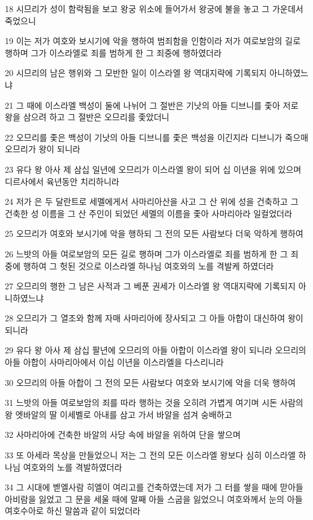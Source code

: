 \par 18 시므리가 성이 함락됨을 보고 왕궁 위소에 들어가서 왕궁에 불을 놓고 그 가운데서 죽었으니
\par 19 이는 저가 여호와 보시기에 악을 행하여 범죄함을 인함이라 저가 여로보암의 길로 행하며 그가 이스라엘로 죄를 범하게 한 그 죄중에 행하였더라
\par 20 시므리의 남은 행위와 그 모반한 일이 이스라엘 왕 역대지략에 기록되지 아니하였느냐
\par 21 그 때에 이스라엘 백성이 둘에 나뉘어 그 절반은 기낫의 아들 디브니를 좇아 저로 왕을 삼으려 하고 그 절반은 오므리를 좇았더니
\par 22 오므리를 좇은 백성이 기낫의 아들 디브니를 좇은 백성을 이긴지라 디브니가 죽으매 오므리가 왕이 되니라
\par 23 유다 왕 아사 제 삼십 일년에 오므리가 이스라엘 왕이 되어 십 이년을 위에 있으며 디르사에서 육년동안 치리하니라
\par 24 저가 은 두 달란트로 세멜에게서 사마리아산을 사고 그 산 위에 성을 건축하고 그 건축한 성 이름을 그 산 주인이 되었던 세멜의 이름을 좇아 사마리아라 일컬었더라
\par 25 오므리가 여호와 보시기에 악을 행하되 그 전의 모든 사람보다 더욱 악하게 행하여
\par 26 느밧의 아들 여로보암의 모든 길로 행하며 그가 이스라엘로 죄를 범하게 한 그 죄 중에 행하여 그 헛된 것으로 이스라엘 하나님 여호와의 노를 격발케 하였더라
\par 27 오므리의 행한 그 남은 사적과 그 베푼 권세가 이스라엘 왕 역대지략에 기록되지 아니하였느냐
\par 28 오므리가 그 열조와 함께 자매 사마리아에 장사되고 그 아들 아합이 대신하여 왕이 되니라
\par 29 유다 왕 아사 제 삼십 팔년에 오므리의 아들 아합이 이스라엘 왕이 되니라 오므리의 아들 아합이 사마리아에서 이십 이년을 이스라엘을 다스리니라
\par 30 오므리의 아들 아합이 그 전의 모든 사람보다 여호와 보시기에 악을 더욱 행하여
\par 31 느밧의 아들 여로보암의 죄를 따라 행하는 것을 오히려 가볍게 여기며 시돈 사람의 왕 엣바알의 딸 이세벨로 아내를 삼고 가서 바알을 섬겨 숭배하고
\par 32 사마리아에 건축한 바알의 사당 속에 바알을 위하여 단을 쌓으며
\par 33 또 아세라 목상을 만들었으니 저는 그 전의 모든 이스라엘 왕보다 심히 이스라엘 하나님 여호와의 노를 격발하였더라
\par 34 그 시대에 벧엘사람 히엘이 여리고를 건축하였는데 저가 그 터를 쌓을 때에 맏아들 아비람을 잃었고 그 문을 세울 때에 말째 아들 스굽을 잃었으니 여호와께서 눈의 아들 여호수아로 하신 말씀과 같이 되었더라

